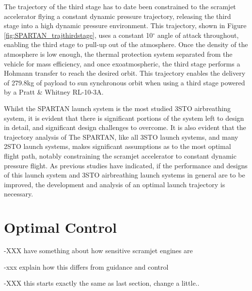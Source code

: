 The trajectory of the third stage has to date been constrained to the scramjet accelerator flying a constant dynamic pressure trajectory, releasing the third stage into a high dynamic pressure environment. This trajectory, shown in Figure \ref{fig:SPARTAN_trajthirdstage}, uses a constant 10$^\circ$ angle of attack throughout, enabling the third stage to pull-up out of the atmosphere.  
 Once the density of the atmosphere is low enough, the thermal protection system separated from the vehicle for mass efficiency, and once exoatmospheric, the third stage performs a Hohmann transfer to reach the desired orbit. 
This trajectory enables the delivery of 279.8kg\cite{Preller2018a} of payload to sun synchronous orbit when using a third stage powered by a Pratt \& Whitney RL-10-3A\cite{Preller2018a}. 

Whilst the SPARTAN launch system is the most studied 3STO airbreathing system, it is evident that there is significant portions of the system left to design in detail, and significant design challenges to overcome. It is also evident that the trajectory analysis of The SPARTAN, like all 3STO launch systems, and many 2STO launch systems, makes significant assumptions as to the most optimal flight path, notably constraining the scramjet accelerator to constant dynamic pressure flight. 
As previous studies have indicated\cite{Preller2017b}, if the performance and designs of this launch system and 3STO airbreathing launch systems in general are to be improved, the development and analysis of an optimal launch trajectory is necessary.






\section{Optimal Control}\label{sec:Optimisation}

-XXX have something about how sensitive scramjet engines are

-xxx explain how this differs from guidance and control

-XXX this starts exactly the same as last section, change a little..


